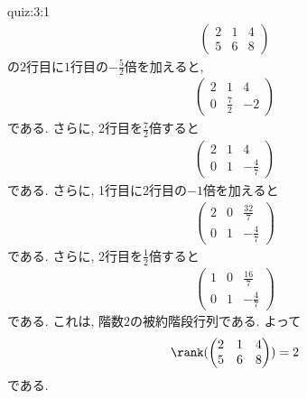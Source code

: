 \begin{answerof}{quiz:3:1}
  \begin{align*}
    \begin{pmatrix}
      2&1&4\\5&6&8
    \end{pmatrix}
  \end{align*}
  の$2$行目に$1$行目の$-\frac{5}{2}$倍を加えると,
  \begin{align*}
    \begin{pmatrix}
      2&1&4\\0&\frac{7}{2}&-2
    \end{pmatrix}
  \end{align*}
  である. さらに,
  2行目を$\frac{7}{2}$倍すると
  \begin{align*}
    \begin{pmatrix}
      2&1&4\\0&1&-\frac{4}{7}
    \end{pmatrix}
  \end{align*}
  である. さらに,
  1行目に2行目の$-1$倍を加えると
  \begin{align*}
    \begin{pmatrix}
      2&0&\frac{32}{7}\\0&1&-\frac{4}{7}
    \end{pmatrix}
  \end{align*}
  である. さらに,
  2行目を$\frac{1}{2}$倍すると
  \begin{align*}
    \begin{pmatrix}
      1&0&\frac{16}{7}\\0&1&-\frac{4}{7}
    \end{pmatrix}
  \end{align*}
  である.
  これは, 階数$2$の被約階段行列である.
  よって
  \begin{align*}
    \rank(
    \begin{pmatrix}
      2&1&4\\5&6&8
    \end{pmatrix}
    )=2
  \end{align*}
  である.
\end{answerof}


